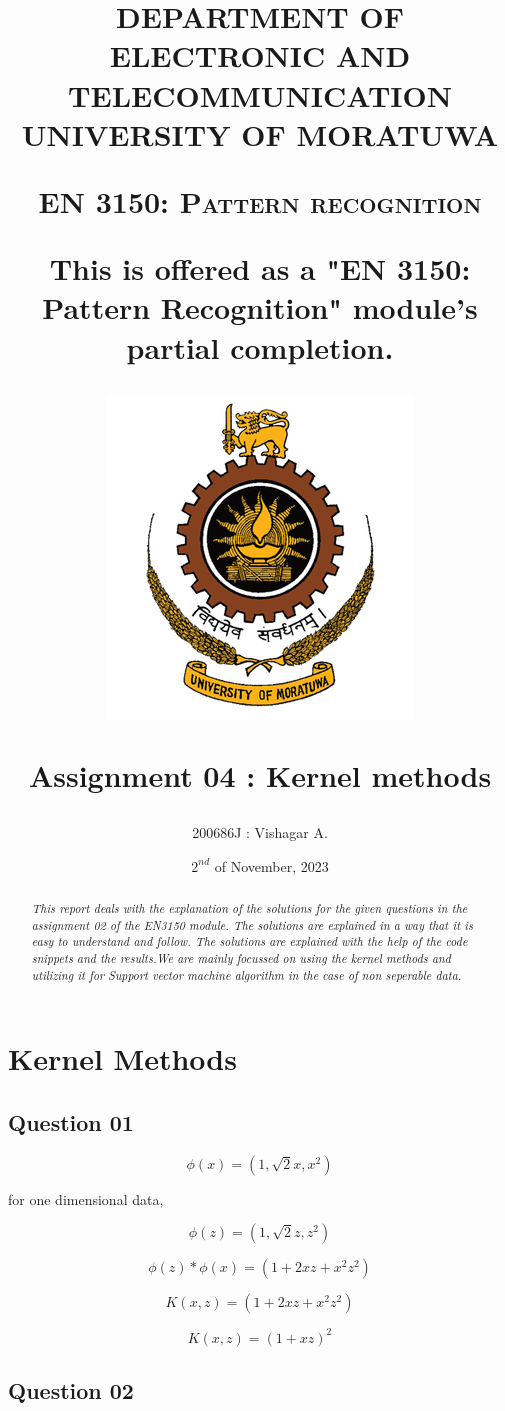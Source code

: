 \documentclass[11pt,a4paper]{article}
\title{DEPARTMENT OF ELECTRONIC AND TELECOMMUNICATION
UNIVERSITY OF MORATUWA

\vspace{10pt}

{\large{\textsc{EN 3150: Pattern recognition}}}

{\textsf{This is offered as a "EN 3150: Pattern Recognition" module's partial completion.}}

\vspace{30pt}
\includegraphics[scale=1.20]{images/University_of_Moratuwa_logo.png}

{\textsf{\textbf{Assignment 04 : Kernel methods}}}}
\author{200686J : Vishagar A.}
\date{$2^{nd}$ of November, 2023}
\begin{document}
\maketitle

\newpage

\begin{abstract}
    \textit{This report deals with the explanation of the solutions for the given questions in the assignment 02 of the EN3150 module. The solutions are explained in a way that it is easy to understand and follow. The solutions are explained with the help of the code snippets and the results.We are mainly focussed on using the kernel methods and utilizing it for Support vector machine algorithm in the case of non seperable data.}    
\end{abstract}    

\vspace{50pt}
\tableofcontents


\newpage

\twocolumn

\section{Kernel Methods}
\subsection{Question 01}

\begin{equation}
    \phi{(x)} =  (1,\sqrt{2}x,x^2)
\end{equation}

for one dimensional data,

\begin{equation}
    \phi{(z)} =  (1,\sqrt{2}z,z^2)
\end{equation}

\begin{equation}
    \phi{(z)}*\phi{(x)} =  (1 + 2xz + x^2z^2)
\end{equation}

\begin{equation}
    K(x,z) =  (1 + 2xz + x^2z^2)
\end{equation}

\begin{equation}
    K(x,z) =  (1 + xz)^2   
\end{equation}

\subsection{Question 02}
\end{document}
